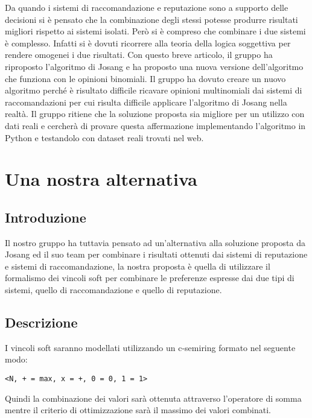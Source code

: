 \documentclass{report}
\begin{document}
	Da quando i sistemi di raccomandazione e reputazione sono a supporto
	delle decisioni si è pensato che la combinazione degli stessi potesse
	produrre risultati migliori rispetto ai sistemi isolati. Però si è
	compreso che combinare i due sistemi è complesso. Infatti si è dovuti
	ricorrere alla teoria della logica soggettiva per rendere omogenei i due
	risultati. Con questo breve articolo, il gruppo ha riproposto
	l'algoritmo di Josang e ha proposto una nuova versione dell'algoritmo
	che funziona con le opinioni binomiali. Il gruppo ha dovuto creare un
	nuovo algoritmo perché è risultato difficile ricavare opinioni
	multinomiali dai sistemi di raccomandazioni per cui risulta difficile
	applicare l'algoritmo di Josang nella realtà. Il gruppo ritiene che la
	soluzione proposta sia migliore per un utilizzo con dati reali e
	cercherà di provare questa affermazione implementando l'algoritmo in
	Python e testandolo con dataset reali trovati nel web.
	
	\hypertarget{header-n226}{%
		\section{Una nostra alternativa}\label{header-n226}}
	
	\hypertarget{header-n227}{%
		\subsection{Introduzione}\label{header-n227}}
	
	Il nostro gruppo ha tuttavia pensato ad un'alternativa alla soluzione
	proposta da Josang ed il suo team per combinare i risultati ottenuti dai
	sistemi di reputazione e sistemi di raccomandazione, la nostra proposta
	è quella di utilizzare il formalismo dei vincoli soft per combinare le
	preferenze espresse dai due tipi di sistemi, quello di raccomandazione e
	quello di reputazione.
	
	\hypertarget{header-n230}{%
		\subsection{Descrizione}\label{header-n230}}
	
	I vincoli soft saranno modellati utilizzando un c-semiring formato nel
	seguente modo:
	
	\texttt{\textless{}N,\ +\ =\ max,\ x\ =\ +,\ 0\ =\ 0,\ 1\ =\ 1\textgreater{}}
	
	Quindi la combinazione dei valori sarà ottenuta attraverso l'operatore
	di somma mentre il criterio di ottimizzazione sarà il massimo dei valori
	combinati.
	
\end{document}
